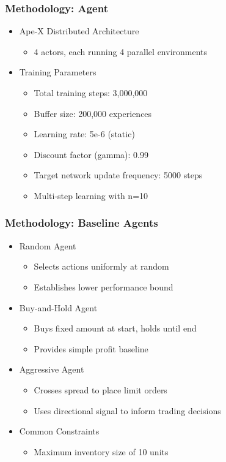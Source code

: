 \documentclass{beamer}
\begin{document}
\begin{frame}
  \frametitle{Methodology: Agent}

  \begin{itemize}
    \item Ape-X Distributed Architecture
    \begin{itemize}
      \item 4 actors, each running 4 parallel environments
    \end{itemize}
    \item Training Parameters
    \begin{itemize}
      \item Total training steps: 3,000,000
      \item Buffer size: 200,000 experiences
      \item Learning rate: 5e-6 (static)
      \item Discount factor (gamma): 0.99
      \item Target network update frequency: 5000 steps
      \item Multi-step learning with n=10
    \end{itemize}
  \end{itemize}
\end{frame}

\begin{frame}
  \frametitle{Methodology: Baseline Agents}

  \begin{itemize}
    \item Random Agent
    \begin{itemize}
      \item Selects actions uniformly at random
      \item Establishes lower performance bound
    \end{itemize}
    \item Buy-and-Hold Agent
    \begin{itemize}
      \item Buys fixed amount at start, holds until end
      \item Provides simple profit baseline
    \end{itemize}
    \item Aggressive Agent
    \begin{itemize}
      \item Crosses spread to place limit orders
      \item Uses directional signal to inform trading decisions
    \end{itemize}
    \item Common Constraints
    \begin{itemize}
      \item Maximum inventory size of 10 units
    \end{itemize}
  \end{itemize}

\end{frame}
\end{document}
